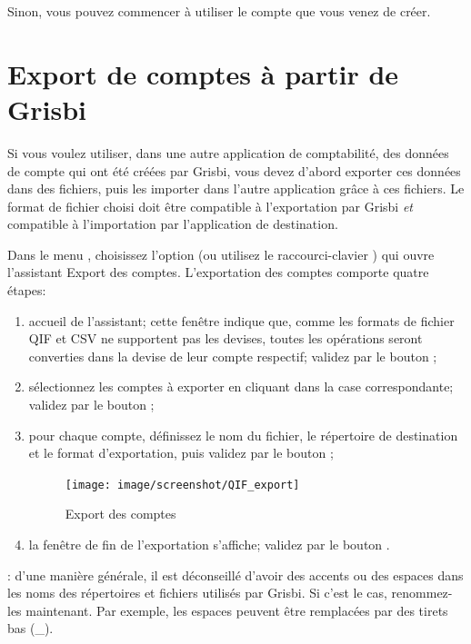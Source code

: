 Sinon, vous pouvez commencer à utiliser le compte que vous venez de créer.


\section{Export de comptes à partir de Grisbi\label{move-export}}


Si vous voulez utiliser, dans une autre application de comptabilité, des données de compte qui ont été créées par Grisbi, vous devez d'abord exporter ces données dans des fichiers, puis les importer dans l'autre application grâce à ces fichiers. Le format de fichier choisi doit être compatible à l'exportation par Grisbi \emph{et} compatible à l'importation par l'application de destination.
 
Dans le menu , choisissez l'option   (ou utilisez le raccourci-clavier ) qui ouvre l'assistant Export des comptes. L'exportation des comptes comporte quatre étapes:

\begin{enumerate}
	\item accueil de l'assistant; cette fenêtre indique que, comme les formats de fichier QIF et CSV ne supportent pas les devises, toutes les opérations seront converties dans la devise de leur compte respectif; validez par le bouton ;
	\item sélectionnez les comptes à exporter en cliquant dans la case correspondante; validez par le bouton ;
	\item pour chaque compte, définissez le nom du fichier, le répertoire de destination et le format d'exportation, puis validez par le bouton  ;
	\begin{figure}[t]
	\begin{center}
	\texttt{[image: image/screenshot/QIF\_export]}
	\end{center}
	\caption{Export des comptes}
	\label{QIF-export-img}
	\end{figure}
	
	\item la fenêtre de fin de l'exportation s'affiche; validez par le bouton .
\end{enumerate}

\Attention{}: d'une manière générale, il est déconseillé d'avoir des accents ou des espaces dans les noms des répertoires et fichiers utilisés par Grisbi. Si c'est le cas, renommez-les maintenant. Par exemple, les espaces peuvent être remplacées par des tirets bas (\_).











